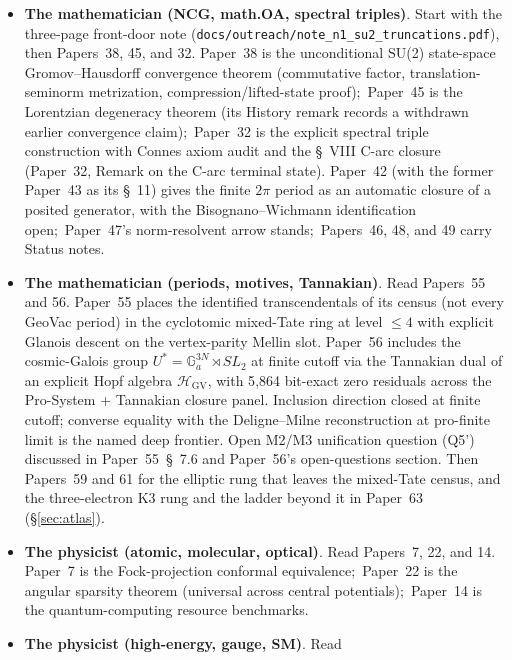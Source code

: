 \documentclass[11pt,a4paper]{article}
\newcommand{\gvc}[2]{#2}
\begin{document}
\begin{itemize}
  \item \textbf{The mathematician (NCG, math.OA, spectral triples)}.
    Start with the three-page front-door note
    (\texttt{docs/outreach/note\_n1\_su2\_truncations.pdf}), then
    Papers~38, 45, and 32.  \gvc{wh1-p38-gh-convergence}{Paper~38 is the unconditional SU(2) state-space Gromov--Hausdorff convergence theorem (commutative factor, translation-seminorm metrization, compression/lifted-state
    proof)};\ \gvc{p45-rates-spatial}{Paper~45 is the Lorentzian degeneracy theorem} (its
    History remark records a withdrawn earlier convergence
    claim);\ Paper~32 is the explicit spectral triple
    construction with Connes axiom audit and the \S~VIII C-arc
    closure (Paper~32, Remark on the C-arc terminal state).  Paper~42 (with the former Paper~43 as its \S~11)
    gives the finite $2\pi$ period as an automatic closure of a posited
    generator, with the Bisognano--Wichmann identification open;\
    Paper~47's norm-resolvent arrow stands;\
    Papers~46, 48, and 49 carry Status notes.
  \item \textbf{The mathematician (periods, motives, Tannakian)}.
    Read Papers~55 and 56.  Paper~55 places the identified
    transcendentals of its census (not every GeoVac period) in the
    cyclotomic mixed-Tate ring at level $\le 4$ with explicit
    Glanois descent on the vertex-parity Mellin slot.  Paper~56
    includes the cosmic-Galois group $U^* = \mathbb{G}_a^{3N}
    \rtimes SL_2$ at finite cutoff via the Tannakian dual of an
    explicit Hopf algebra $\mathcal{H}_{\mathrm{GV}}$, with 5{,}864
    bit-exact zero residuals across the Pro-System + Tannakian
    closure panel.  Inclusion direction closed at finite cutoff;
    converse equality with the Deligne--Milne reconstruction at
    pro-finite limit is the named deep frontier.  Open
    M2/M3 unification question (Q5') discussed in Paper~55~\S~7.6
    and Paper~56's open-questions section.  Then Papers~59 and 61 for
    the elliptic rung that leaves the mixed-Tate census, and the
    three-electron K3 rung and the ladder beyond it in
    Paper~63~\cite{loutey_paper63} (\S\ref{sec:atlas}).
  \item \textbf{The physicist (atomic, molecular, optical)}.  Read
    Papers~7, 22, and 14.  Paper~7 is the Fock-projection conformal
    equivalence;\ Paper~22 is the angular sparsity theorem (universal
    across central potentials);\ Paper~14 is the quantum-computing
    resource benchmarks.
  \item \textbf{The physicist (high-energy, gauge, SM)}.  Read

\end{itemize}
\end{document}
